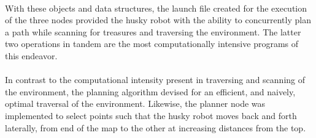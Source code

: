 \documentclass[12pt]{article}
\begin{document}
{  \paragraph{}With these objects and data structures, the launch file created for the execution of the three nodes provided the husky robot with the ability to concurrently plan a path while scanning for treasures and traversing the environment. The latter two operations in tandem are the most computationally intensive programs of this endeavor. 
  \paragraph{}In contrast to the computational intensity present in traversing and scanning of the environment, the planning algorithm devised for an efficient, and naively, optimal traversal of the environment. Likewise, the planner node was implemented to select points such that the husky robot moves back and forth  laterally, from end of the map to the other at increasing distances from the top.      
  \\\\
}
\end{document}
